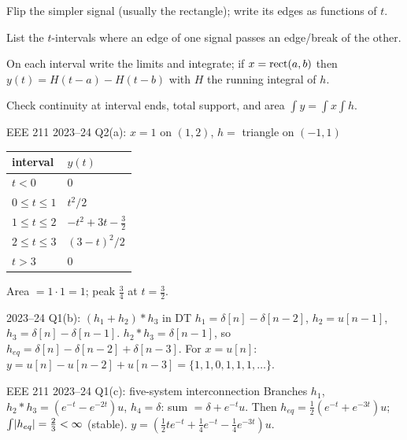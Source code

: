\begin{method}
\begin{steps}
\item Flip the simpler signal (usually the rectangle); write its edges as functions of $t$.
\item List the $t$-intervals where an edge of one signal passes an edge/break of the other.
\item On each interval write the limits and integrate; if $x=\operatorname{rect}(a,b)$ then $y(t)=H(t-a)-H(t-b)$ with $H$ the running integral of $h$.
\item Check continuity at interval ends, total support, and area $\int y=\int x\int h$.
\end{steps}
\end{method}
\begin{example}{EEE 211 2023--24 Q2(a): $x=1$ on $(1,2)$, $h=$ triangle on $(-1,1)$}
\begin{center}\small\begin{tabular}{@{}ll@{}}\toprule
interval & $y(t)$\\\midrule
$t<0$ & $0$\\ $0\le t\le1$ & $t^2/2$\\ $1\le t\le2$ & $-t^2+3t-\tfrac32$\\ $2\le t\le3$ & $(3-t)^2/2$\\ $t>3$ & $0$\\\bottomrule
\end{tabular}\end{center}
Area $=1\cdot1=1$; peak $\tfrac34$ at $t=\tfrac32$.
\end{example}
\begin{example}{2023--24 Q1(b): $(h_1+h_2)*h_3$ in DT}
$h_1=\delta[n]-\delta[n-2]$, $h_2=u[n-1]$, $h_3=\delta[n]-\delta[n-1]$. $h_2*h_3=\delta[n-1]$, so $h_{eq}=\delta[n]-\delta[n-2]+\delta[n-3]$. For $x=u[n]$: $y=u[n]-u[n-2]+u[n-3]=\{1,1,0,1,1,1,\dots\}$.
\end{example}
\begin{example}{EEE 211 2023--24 Q1(c): five-system interconnection}
Branches $h_1$, $h_2*h_3=(e^{-t}-e^{-2t})u$, $h_4=\delta$: sum $=\delta+e^{-t}u$. Then $h_{eq}=\tfrac12(e^{-t}+e^{-3t})u$; $\int\lvert h_{eq}\rvert=\tfrac23<\infty$ (stable). $y=(\tfrac12te^{-t}+\tfrac14e^{-t}-\tfrac14e^{-3t})u$.
\end{example}

